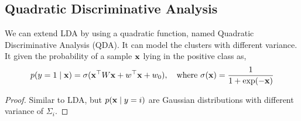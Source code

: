 \subsection{Quadratic Discriminative Analysis}
\begin{definition}
	We can extend LDA by using a quadratic function, named Quadratic Discriminative Analysis (QDA). It can model the clusters with different variance. It given the probability of a sample $\mathbf{x}$ lying in the positive class as,
	\begin{equation}
		p(y = 1 \mid \mathbf{x}) = \sigma(\mathbf{x}^\top W \mathbf{x} + w^\top \mathbf{x} + w_0), \quad \text{where}\ \sigma(\mathbf{x}) = \frac{1}{1 + \exp(-\mathbf{x})}
	\end{equation}
\end{definition}
\begin{proof}
	Similar to LDA, but $p(\mathbf{x} \mid y=i)$ are Gaussian distributions with different variance of $\Sigma_i$.
\end{proof}